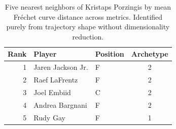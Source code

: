 \begin{table}[htbp]
  \centering\small
  \begin{tabular}{rllc}
    \toprule
    Rank & Player & Position & Archetype \\
    \midrule
    1 & Jaren Jackson Jr. & F & 2 \\
    2 & Raef LaFrentz & F & 2 \\
    3 & Joel Embiid & C & 2 \\
    4 & Andrea Bargnani & F & 2 \\
    5 & Rudy Gay & F & 1 \\
    \bottomrule
  \end{tabular}
  \caption{Five nearest neighbors of Kristaps Porzingis by mean Fr\'{e}chet curve distance across metrics. Identified purely from trajectory shape without dimensionality reduction.}
  \label{tab:Kristaps_Porzingis_frechet_curve_neighbors}
\end{table}

